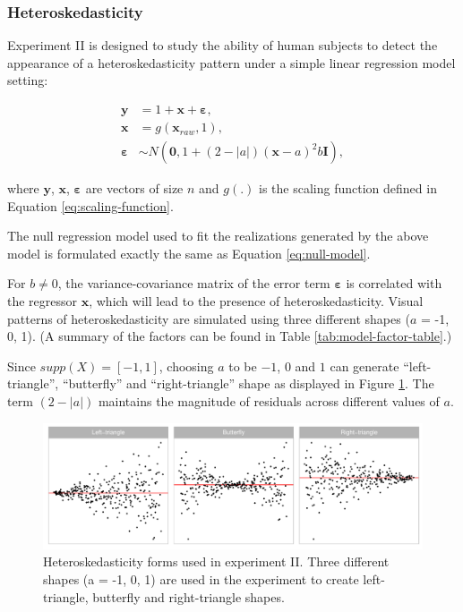 \documentclass[]{interact}
\theoremstyle{plain}%
\theoremstyle{definition}
\theoremstyle{remark}
\begin{document}
\hypertarget{heteroskedasticity}{%
\subsubsection{Heteroskedasticity}\label{heteroskedasticity}}

Experiment II is designed to study the ability of human subjects to
detect the appearance of a heteroskedasticity pattern under a simple
linear regression model setting:

\begin{align} \label{eq:heter-model}
\boldsymbol{y} &= 1 + \boldsymbol{x} + \boldsymbol{\varepsilon},\\
\boldsymbol{x} &= g(\boldsymbol{x}_{raw}, 1),\\
\boldsymbol{\varepsilon} &\sim N(\boldsymbol{0}, 1 + (2 - |a|)(\boldsymbol{x} - a)^2b \boldsymbol{I}), 
\end{align}

\noindent where \(\boldsymbol{y}\), \(\boldsymbol{x}\),
\(\boldsymbol{\varepsilon}\) are vectors of size \(n\) and \(g(.)\) is
the scaling function defined in Equation \ref{eq:scaling-function}.

The null regression model used to fit the realizations generated by the
above model is formulated exactly the same as Equation
\ref{eq:null-model}.

For \(b \neq 0\), the variance-covariance matrix of the error term
\(\boldsymbol{\varepsilon}\) is correlated with the regressor
\(\boldsymbol{x}\), which will lead to the presence of
heteroskedasticity. Visual patterns of heteroskedasticity are simulated
using three different shapes (\(a\) = -1, 0, 1). (A summary of the
factors can be found in Table \ref{tab:model-factor-table}.)

Since \(supp(X) = [-1, 1]\), choosing \(a\) to be \(-1\), \(0\) and
\(1\) can generate ``left-triangle'', ``butterfly'' and
``right-triangle'' shape as displayed in Figure
\ref{fig:different-shape-of-heter}. The term \((2 - |a|)\) maintains the
magnitude of residuals across different values of \(a\).

\begin{figure}

{\centering \includegraphics[width=1\linewidth]{paper_comparison_files/figure-latex/different-shape-of-heter-1} 

}

\caption{Heteroskedasticity forms used in experiment II. Three different shapes (a = -1, 0, 1) are used in the experiment to create left-triangle, butterfly and right-triangle shapes.}\label{fig:different-shape-of-heter}
\end{figure}
\end{document}
